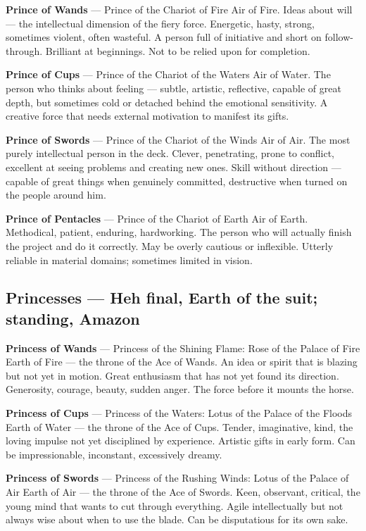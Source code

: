 \textbf{Prince of Wands} --- Prince of the Chariot of Fire Air of Fire. Ideas about will --- the intellectual dimension of the fiery force. Energetic, hasty, strong, sometimes violent, often wasteful. A person full of initiative and short on follow-through. Brilliant at beginnings. Not to be relied upon for completion.

\textbf{Prince of Cups} --- Prince of the Chariot of the Waters Air of Water. The person who thinks about feeling --- subtle, artistic, reflective, capable of great depth, but sometimes cold or detached behind the emotional sensitivity. A creative force that needs external motivation to manifest its gifts.

\textbf{Prince of Swords} --- Prince of the Chariot of the Winds Air of Air. The most purely intellectual person in the deck. Clever, penetrating, prone to conflict, excellent at seeing problems and creating new ones. Skill without direction --- capable of great things when genuinely committed, destructive when turned on the people around him.

\textbf{Prince of Pentacles} --- Prince of the Chariot of Earth Air of Earth. Methodical, patient, enduring, hardworking. The person who will actually finish the project and do it correctly. May be overly cautious or inflexible. Utterly reliable in material domains; sometimes limited in vision.

\subsection{Princesses --- Heh final, Earth of the suit; standing, Amazon}\label{princesses--heh-final-earth-of-the-suit-standing-amazon}

\textbf{Princess of Wands} --- Princess of the Shining Flame: Rose of the Palace of Fire Earth of Fire --- the throne of the Ace of Wands. An idea or spirit that is blazing but not yet in motion. Great enthusiasm that has not yet found its direction. Generosity, courage, beauty, sudden anger. The force before it mounts the horse.

\textbf{Princess of Cups} --- Princess of the Waters: Lotus of the Palace of the Floods Earth of Water --- the throne of the Ace of Cups. Tender, imaginative, kind, the loving impulse not yet disciplined by experience. Artistic gifts in early form. Can be impressionable, inconstant, excessively dreamy.

\textbf{Princess of Swords} --- Princess of the Rushing Winds: Lotus of the Palace of Air Earth of Air --- the throne of the Ace of Swords. Keen, observant, critical, the young mind that wants to cut through everything. Agile intellectually but not always wise about when to use the blade. Can be disputatious for its own sake.

